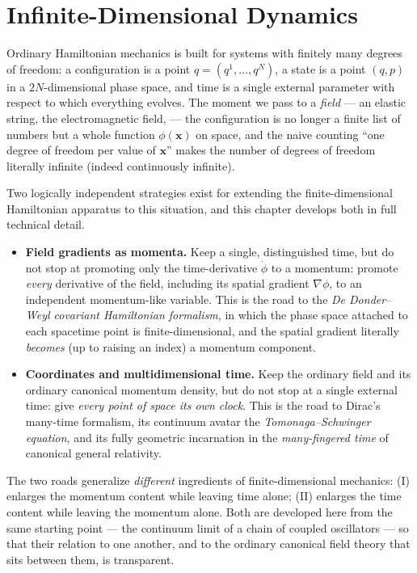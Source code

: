 \chapter{Infinite-Dimensional Dynamics}
\label{id}
\newcommand{\rd}{\mathrm{d}}
\newcommand{\Lag}{\mathcal{L}}
\newcommand{\Ham}{\mathcal{H}}

Ordinary Hamiltonian mechanics is built for systems with finitely many degrees
of freedom: a configuration is a point $q=(q^1,\dots,q^N)$, a state is a point
$(q,p)$ in a $2N$-dimensional phase space, and time is a single external
parameter with respect to which everything evolves. The moment we pass to a
\emph{field} --- an elastic string, the electromagnetic field, 
--- the configuration is no longer a finite list of numbers but a whole
function $\phi(\mathbf{x})$ on space, and the naive counting ``one degree of
freedom per value of $\mathbf{x}$'' makes the number of degrees of freedom
literally infinite (indeed continuously infinite).

Two logically independent strategies exist for extending the finite-dimensional
Hamiltonian apparatus to this situation, and this chapter develops both in full
technical detail.

\begin{itemize}
\item[(I)] \textbf{Field gradients as momenta.} Keep a single, distinguished
    time, but do not stop at promoting only the time-derivative $\dot\phi$ to a
        momentum: promote \emph{every} derivative of the field, including its
        spatial gradient $\nabla\phi$, to an independent momentum-like
        variable. This is the road to the \emph{De Donder--Weyl covariant
        Hamiltonian formalism}, in which the phase space attached to each
        spacetime point is finite-dimensional, and the spatial gradient
        literally \emph{becomes} (up to raising an index) a momentum component.
\item[(II)] \textbf{Coordinates and multidimensional time.} Keep the ordinary
    field and its ordinary canonical momentum density, but do not stop at a
        single external time: give \emph{every point of space its own clock}.
        This is the road to Dirac's many-time formalism, its continuum avatar
        the \emph{Tomonaga--Schwinger equation}, and its fully geometric
        incarnation in the \emph{many-fingered time} of canonical general
        relativity.
\end{itemize}

The two roads generalize \emph{different} ingredients of finite-dimensional
mechanics: (I) enlarges the momentum content while leaving time alone; (II)
enlarges the time content while leaving the momentum alone. Both are developed
here from the same starting point --- the continuum limit of a chain of coupled
oscillators --- so that their relation to one another, and to the ordinary
canonical field theory that sits between them, is transparent.

